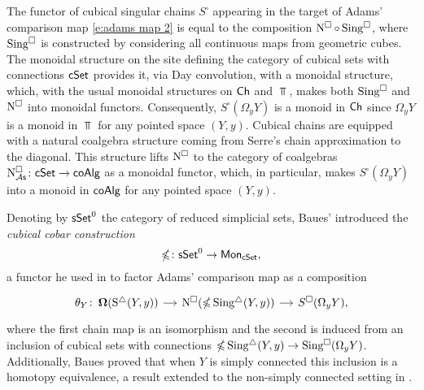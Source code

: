 The functor of cubical singular chains $S^\square$ appearing in the target of Adams' comparison map \eqref{e:adams map 2} is equal to the composition $\operatorname{N^{\square}} \circ \operatorname{Sing^{\square}}$, where $\operatorname{Sing^{\square}}$ is constructed by considering all continuous maps from geometric cubes.
The monoidal structure on the site defining the category of cubical sets with connections $\mathsf{cSet}$ provides it, via Day convolution, with a monoidal structure, which, with the usual monoidal structures on $\mathsf{Ch}$ and $\Top$, makes both $\operatorname{Sing^{\square}}$ and $\operatorname{N^{\square}}$ into monoidal functors.
Consequently, $S^\square(\Omega_y Y)$ is a monoid in $\mathsf{Ch}$ since $\Omega_y Y$ is a monoid in $\Top$ for any pointed space $(Y, y)$.
Cubical chains are equipped with a natural coalgebra structure coming from Serre's chain approximation to the diagonal.
This structure lifts $\operatorname{N^{\square}}$ to the category of coalgebras $\operatorname{N^{\square}_{\mathcal{A}\mathsf{s}}} \colon \mathsf{cSet} \to \mathsf{coAlg}$ as a monoidal functor, which, in particular, makes $S^\square(\Omega_y Y)$ into a monoid in $\mathsf{coAlg}$ for any pointed space $(Y, y)$.

Denoting by $\mathsf{sSet}^0$ the category of reduced simplicial sets, Baues' introduced the \textit{cubical cobar construction}
\begin{equation*}
\operatorname{\mathbb{\Omega}} \colon \mathsf{sSet}^0 \to \mathsf{Mon}_{\mathsf{cSet}},
\end{equation*}
a functor he used in \cite{baues1998hopf} to factor Adams' comparison map as a composition
\begin{equation} \label{e:baues factorization of adams map}
\begin{tikzcd}[column sep = small]
\theta_Y \colon \cobar(\sS(Y, y)) \arrow[r] &
\cchains(\ccobar \sSing(Y, y)) \arrow[r] &
S^{\square}(\Omega_y Y),
\end{tikzcd}
\end{equation}
where the first chain map is an isomorphism and the second is induced from an inclusion of cubical sets with connections $\operatorname{\mathbb{\Omega}} \operatorname{Sing^{\triangle}}(Y, y) \to \operatorname{Sing^{\square}}(\Omega_y Y)$.
Additionally, Baues proved that when $Y$ is simply connected this inclusion is a homotopy equivalence, a result extended to the non-simply connected setting in \cite{rivera2019path}.

